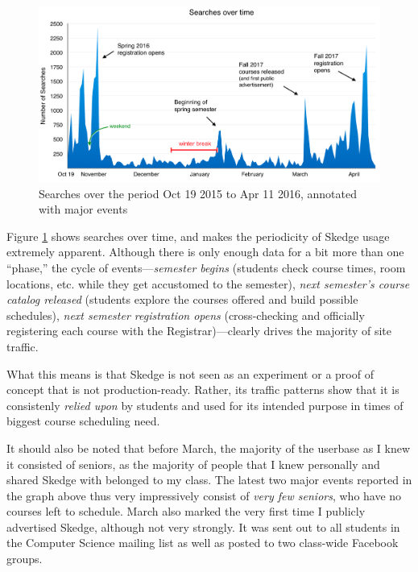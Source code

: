 \begin{figure}[H]
  \centering

  \includegraphics[width=1.0\textwidth]{images/graph/searches}

  \caption{Searches over the period Oct 19 2015 to Apr 11 2016, annotated with major events}
  \label{fig:searches}

\end{figure}

Figure \ref{fig:searches} shows searches over time, and makes the periodicity of Skedge usage extremely apparent. Although there is only enough data for a bit more than one ``phase,'' the cycle of events---\emph{semester begins} (students check course times, room locations, etc. while they get accustomed to the semester), \emph{next semester's course catalog released} (students explore the courses offered and build possible schedules), \emph{next semester registration opens} (cross-checking and officially registering each course with the Registrar)---clearly drives the majority of site traffic.

What this means is that Skedge is not seen as an experiment or a proof of concept that is not production-ready. Rather, its traffic patterns show that it is consistenly \emph{relied upon} by students and used for its intended purpose in times of biggest course scheduling need.

It should also be noted that before March, the majority of the userbase as I knew it consisted of seniors, as the majority of people that I knew personally and shared Skedge with belonged to my class. The latest two major events reported in the graph above thus very impressively consist of \emph{very few seniors}, who have no courses left to schedule. March also marked the very first time I publicly advertised Skedge, although not very strongly. It was sent out to all students in the Computer Science mailing list as well as posted to two class-wide Facebook groups.

